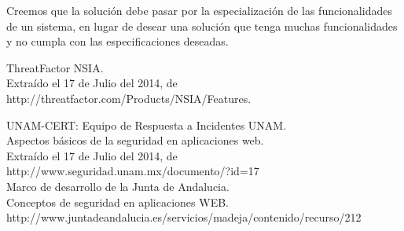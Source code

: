 \documentclass[letter,twoside,11pt]{article}
\begin{document}
Creemos que la solución debe pasar por la especialización de las funcionalidades
de un sistema, en lugar de desear una solución que tenga muchas funcionalidades
y no cumpla con las especificaciones deseadas.

\begin{thebibliography}{99}

     ThreatFactor NSIA.\\
    Extraído el 17 de Julio del 2014, de\\
    http://threatfactor.com/Products/NSIA/Features.

     UNAM-CERT: Equipo de Respuesta a Incidentes UNAM.\\
    Aspectos básicos de la seguridad en aplicaciones web.\\
    Extraído el 17 de Julio del 2014, de\\
    http://www.seguridad.unam.mx/documento/?id=17\\

     Marco de desarrollo de la Junta de Andalucia.\\
    Conceptos de seguridad en aplicaciones WEB.\\
    http://www.juntadeandalucia.es/servicios/madeja/contenido/recurso/212\\
\end{thebibliography}
\end{document}

